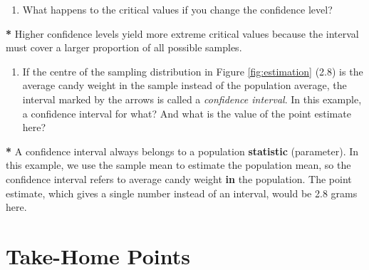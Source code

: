 \documentclass[a4paper]{book}
\newenvironment{Shaded}{\begin{snugshade}}{\end{snugshade}}
\newcommand{\KeywordTok}[1]{\textcolor[rgb]{0,0,0}{\textbf{#1}}}
\newcommand{\FloatTok}[1]{\textcolor[rgb]{0.00,0.00,0.00}{#1}}
\newcommand{\StringTok}[1]{\textcolor[rgb]{0.00,0.00,0.00}{#1}}
\newcommand{\ControlFlowTok}[1]{\textcolor[rgb]{0.00,0.00,0.00}{\textbf{#1}}}
\newcommand{\OperatorTok}[1]{\textcolor[rgb]{0.00,0.00,0.00}{\textbf{#1}}}
\newcommand{\NormalTok}[1]{#1}
\providecommand{\tightlist}{%
  \setlength{\itemsep}{0pt}\setlength{\parskip}{0pt}}
\theoremstyle{definition}
\theoremstyle{definition}
\theoremstyle{definition}
\theoremstyle{remark}
\begin{document}
\begin{enumerate}
\def\labelenumi{\arabic{enumi}.}
\setcounter{enumi}{6}
\tightlist
\item
  What happens to the critical values if you change the confidence
  level?
\end{enumerate}

\begin{Shaded}
\begin{Highlighting}[]
\OperatorTok{*}\StringTok{ }\NormalTok{Higher confidence levels yield more extreme critical values because }
\NormalTok{the interval must cover a larger proportion of all possible samples.}
\end{Highlighting}
\end{Shaded}

\begin{enumerate}
\def\labelenumi{\arabic{enumi}.}
\setcounter{enumi}{7}
\tightlist
\item
  If the centre of the sampling distribution in Figure
  \ref{fig:estimation} (2.8) is the average candy weight in the sample
  instead of the population average, the interval marked by the arrows
  is called a \emph{confidence interval}. In this example, a confidence
  interval for what? And what is the value of the point estimate here?
\end{enumerate}

\begin{Shaded}
\begin{Highlighting}[]
\OperatorTok{*}\StringTok{ }\NormalTok{A confidence interval always belongs to a population }\KeywordTok{statistic}\NormalTok{ (parameter).}
\NormalTok{In this example, we use the sample mean to estimate the population mean, so}
\NormalTok{the confidence interval refers to average candy weight }\ControlFlowTok{in}\NormalTok{ the population. The}
\NormalTok{point estimate, which gives a single number instead of an interval, would be}
\FloatTok{2.8}\NormalTok{ grams here.}
\end{Highlighting}
\end{Shaded}

\section{Take-Home Points}\label{take-home-points-2}
\end{document}
